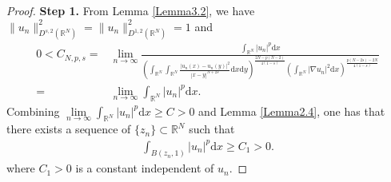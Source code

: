 \documentclass[12pt,a4paper,reqno]{amsart}
\numberwithin{equation}{section}
\begin{document}
\begin{proof}
{\bf Step 1.}
From Lemma \ref{Lemma3.2}, we have $\|u_{n}\|_{D^{s,2}(\mathbb{R}^{N})}^{2}
=
\|u_{n}\|_{D^{1,2}(\mathbb{R}^{N})}^{2}
=1$ and
\begin{equation*}
\begin{aligned}
0<C_{N,p,s}
=&\lim\limits_{n\to\infty}
\frac
{\int_{\mathbb{R}^{N}}
|u_{n}|^{p}
\mathrm{d}x}
{\left(
\int_{\mathbb{R}^{N}}
\int_{\mathbb{R}^{N}}
\frac{|u_{n}(x)-u_{n}(y)|^{2}}{|x-y|^{N+2s}}
\mathrm{d}x
\mathrm{d}y
\right)
^{\frac{2N-p(N-2)}{4(1-s)}}
\left(
\int_{\mathbb{R}^{N}}
|\nabla u_{n}|^{2}
\mathrm{d}x
\right)
^{\frac{p(N-2s)-2N}{4(1-s)}}}\\
=&\lim\limits_{n\to\infty}
\int_{\mathbb{R}^{N}}
|u_{n}|^{p}
\mathrm{d}x.
\end{aligned}
\end{equation*}
Combining $\lim\limits_{n\to\infty}
\int_{\mathbb{R}^{N}}
|u_{n}|^{p}
\mathrm{d}x\geqslant C>0$ and Lemma \ref{Lemma2.4}, one has that there exists a sequence of $\{z_{n}\}\subset \mathbb{R}^{N}$ such that
\begin{equation}\label{3.3}
\begin{aligned}
\int_{B(z_{n},1)}
|u_{n}|^{p}
\mathrm{d}x
\geqslant C_{1}>0.
\end{aligned}
\end{equation}
where $C_{1}>0$ is a constant independent of $u_{n}$.



\end{proof}
\end{document}
